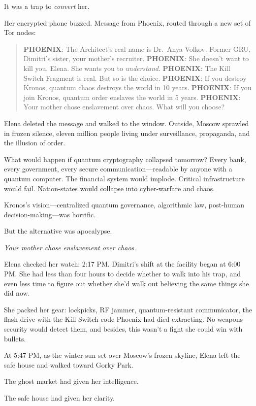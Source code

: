 \documentclass[12pt,letterpaper]{book}
\begin{document}
It was a trap to \emph{convert} her.

Her encrypted phone buzzed. Message from Phoenix, routed through a new set of Tor nodes:

\begin{quote}
\textbf{PHOENIX}: The Architect's real name is Dr.~Anya Volkov. Former GRU, Dimitri's sister, your mother's recruiter. \textbf{PHOENIX}: She doesn't want to kill you, Elena. She wants you to \emph{understand}. \textbf{PHOENIX}: The Kill Switch Fragment is real. But so is the choice. \textbf{PHOENIX}: If you destroy Kronos, quantum chaos destroys the world in 10 years. \textbf{PHOENIX}: If you join Kronos, quantum order enslaves the world in 5 years. \textbf{PHOENIX}: Your mother chose enslavement over chaos. What will you choose?
\end{quote}

Elena deleted the message and walked to the window. Outside, Moscow sprawled in frozen silence, eleven million people living under surveillance, propaganda, and the illusion of order.

What would happen if quantum cryptography collapsed tomorrow? Every bank, every government, every secure communication---readable by anyone with a quantum computer. The financial system would implode. Critical infrastructure would fail. Nation-states would collapse into cyber-warfare and chaos.

Kronos's vision---centralized quantum governance, algorithmic law, post-human decision-making---was horrific.

But the alternative was apocalypse.

\emph{Your mother chose enslavement over chaos.}

Elena checked her watch: 2:17 PM. Dimitri's shift at the facility began at 6:00 PM. She had less than four hours to decide whether to walk into his trap, and even less time to figure out whether she'd walk out believing the same things she did now.

She packed her gear: lockpicks, RF jammer, quantum-resistant communicator, the flash drive with the Kill Switch code Phoenix had died extracting. No weapons---security would detect them, and besides, this wasn't a fight she could win with bullets.

At 5:47 PM, as the winter sun set over Moscow's frozen skyline, Elena left the safe house and walked toward Gorky Park.

The ghost market had given her intelligence.

The safe house had given her clarity.
\end{document}
